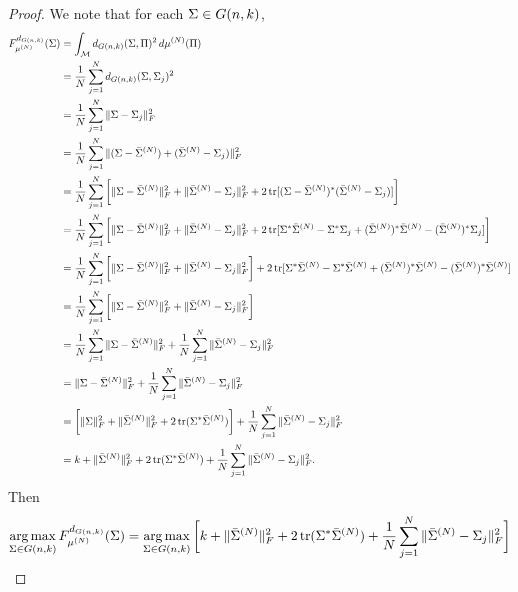 \documentclass{book}
\begin{document}
	\begin{proof}
		We note that for each $\Sigma \in G(n,k)$,
		\begin{align*}
			F^{d_{G(n,k)}}_{\mu^{(N)}}(\Sigma)
			& = \int_{\mathcal{M}} d_{G(n,k)}(\Sigma, \Pi)^2 \, d \mu^{(N)}(\Pi) \\
			& = \frac{1}{N} \sum_{j =1}^N d_{G(n,k)}(\Sigma, \Sigma_j)^2 \\
			& = \frac{1}{N} \sum_{j =1}^N \| \Sigma - \Sigma_j \|_F^2 \\
			& = \frac{1}{N} \sum_{j =1}^N \| (\Sigma - \bar{\Sigma}^{(N)}) + (\bar{\Sigma}^{(N)} - \Sigma_j) \|_F^2 \\
			& = \frac{1}{N} \sum_{j =1}^N \bigg[ \| \Sigma - \bar{\Sigma}^{(N)} \|_F^2 + \| \bar{\Sigma}^{(N)} - \Sigma_j \|_F^2 + 2\operatorname{\text{tr}}[(\Sigma - \bar{\Sigma}^{(N)})^*(\bar{\Sigma}^{(N)} - \Sigma_j)] \bigg] \\
			& = \frac{1}{N} \sum_{j =1}^N \bigg[ \| \Sigma - \bar{\Sigma}^{(N)} \|_F^2 + \| \bar{\Sigma}^{(N)} - \Sigma_j \|_F^2 + 2\operatorname{\text{tr}}[ \Sigma^*\bar{\Sigma}^{(N)} - \Sigma^* \Sigma_j + (\bar{\Sigma}^{(N)})^*\bar{\Sigma}^{(N)} - (\bar{\Sigma}^{(N)})^*\Sigma_j ] \bigg] \\
			& = \frac{1}{N}  \sum_{j =1}^N \bigg[ \| \Sigma - \bar{\Sigma}^{(N)} \|_F^2 + \| \bar{\Sigma}^{(N)} - \Sigma_j \|_F^2 \bigg] + 2\operatorname{\text{tr}}[ \Sigma^*\bar{\Sigma}^{(N)} -  \Sigma^*\bar{\Sigma}^{(N)} + (\bar{\Sigma}^{(N)})^*\bar{\Sigma}^{(N)} - (\bar{\Sigma}^{(N)})^*\bar{\Sigma}^{(N)}] \\
			& = \frac{1}{N}  \sum_{j =1}^N \bigg[ \| \Sigma - \bar{\Sigma}^{(N)} \|_F^2 + \| \bar{\Sigma}^{(N)} - \Sigma_j \|_F^2 \bigg] \\
			& = \frac{1}{N} \sum_{j =1}^N  \| \Sigma - \bar{\Sigma}^{(N)} \|_F^2 + \frac{1}{N} \sum_{j =1}^N  \| \bar{\Sigma}^{(N)} - \Sigma_j \|_F^2  \\
			& = \| \Sigma - \bar{\Sigma}^{(N)} \|_F^2 + \frac{1}{N} \sum_{j =1}^N  \| \bar{\Sigma}^{(N)} - \Sigma_j \|_F^2  \\
			& = \bigg[ \| \Sigma \|_F^2 + \| \bar{\Sigma}^{(N)} \|_F^2 + 2 \operatorname{\text{tr}}(\Sigma^*\bar{\Sigma}^{(N)}) \bigg] + \frac{1}{N} \sum_{j =1}^N  \| \bar{\Sigma}^{(N)} - \Sigma_j \|_F^2 \\
			& = k + \| \bar{\Sigma}^{(N)} \|_F^2 + 2 \operatorname{\text{tr}}(\Sigma^*\bar{\Sigma}^{(N)}) + \frac{1}{N} \sum_{j =1}^N  \| \bar{\Sigma}^{(N)} - \Sigma_j \|_F^2.
		\end{align*}
		Then
		\begin{align*}
			\argmax_{\Sig \in G(n,k)} F^{d_{G(n,k)}}_{\mu^{(N)}}(\Sig)
			& = \argmax_{\Sig \in G(n,k)} \bigg[ k + \| \bar{\Sig}^{(N)} \|_F^2 + 2 \tr(\Sig^*\bar{\Sig}^{(N)}) + \frac{1}{N} \sum_{j =1}^N  \| \bar{\Sig}^{(N)} - \Sig_j \|_F^2 \bigg] \\

\end{align*}
\end{proof}
\end{document}
